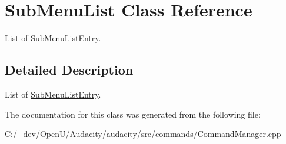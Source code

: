 \hypertarget{class_sub_menu_list}{}\section{Sub\+Menu\+List Class Reference}
\label{class_sub_menu_list}


List of \hyperlink{struct_sub_menu_list_entry}{Sub\+Menu\+List\+Entry}.  




\subsection{Detailed Description}
List of \hyperlink{struct_sub_menu_list_entry}{Sub\+Menu\+List\+Entry}. 

The documentation for this class was generated from the following file\+:\begin{DoxyCompactItemize}
\item 
C\+:/\+\_\+dev/\+Open\+U/\+Audacity/audacity/src/commands/\hyperlink{_command_manager_8cpp}{Command\+Manager.\+cpp}\end{DoxyCompactItemize}
